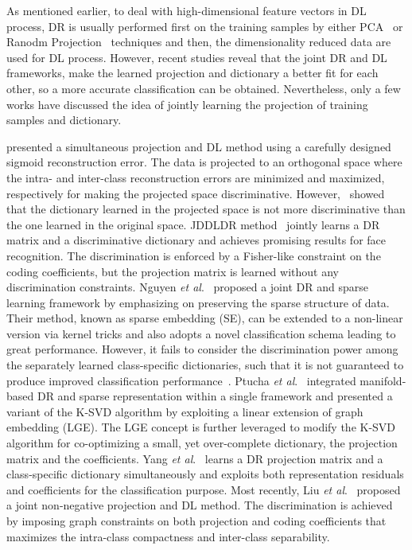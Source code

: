 \documentclass[journal]{IEEEtran}
\newcommand{\etal}{\textit{et al}.}
\begin{document}
As mentioned earlier, to deal with high-dimensional feature vectors in DL process, DR is usually performed first on the training samples by either PCA~\cite{PCA} or Ranodm Projection~\cite{RP} techniques and then, the dimensionality reduced data are used for DL process. However, recent studies reveal that the joint DR and DL frameworks, make the learned projection and dictionary a better fit for each other, so a more accurate classification can be obtained. Nevertheless, only a few works have discussed the idea of jointly learning the projection of training samples and dictionary.

\cite{Simul-SRC} presented a simultaneous projection and DL method using a carefully designed sigmoid reconstruction error. The data is projected to an orthogonal space where the intra- and inter-class reconstruction errors are minimized and maximized, respectively for making the projected space discriminative. However,~\cite{Invariance} showed that the dictionary learned in the projected space is not more discriminative than the one learned in the original space. JDDLDR method~\cite{JDDRDL} jointly learns a DR matrix and a discriminative dictionary and achieves promising results for face recognition. The discrimination is enforced by a Fisher-like constraint on the coding coefficients, but the projection matrix is learned without any discrimination constraints. Nguyen \etal~\cite{SE} proposed a joint DR and sparse learning framework by emphasizing on preserving the sparse structure of data. Their method, known as sparse embedding (SE), can be extended to a non-linear version via kernel tricks and also adopts a novel classification schema leading to great performance. However, it fails to consider the discrimination power among the separately learned class-specific dictionaries, such that it is not guaranteed to produce improved classification performance~\cite{Problem-SE}. 
Ptucha \etal~\cite{LGE-KSVD} integrated manifold-based DR and sparse representation within a single framework and presented a variant of the K-SVD algorithm by exploiting a linear extension of graph embedding (LGE). The LGE concept is further leveraged to modify the K-SVD algorithm for co-optimizing a small, yet over-complete dictionary, the projection matrix and the coefficients. Yang \etal~\cite{Simul-DL} learns a DR projection matrix and a class-specific dictionary simultaneously and exploits both representation residuals and coefficients for the classification purpose. Most recently, Liu \etal~\cite{JNPDL} proposed a joint non-negative projection and DL method. The discrimination is achieved by imposing graph constraints on both projection and coding coefficients that maximizes the intra-class compactness and inter-class separability.
\end{document}
